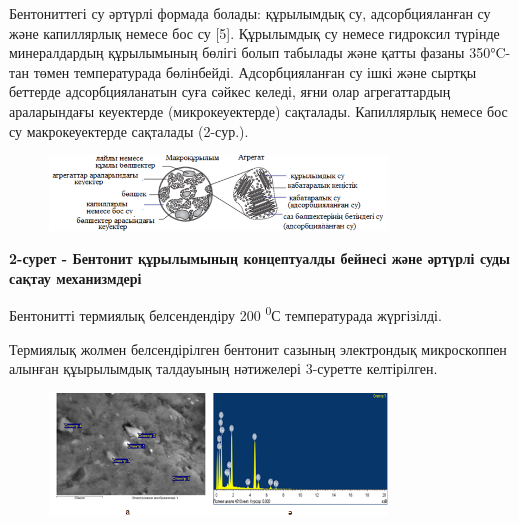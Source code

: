 Бентониттегі су әртүрлі формада болады: құрылымдық су, адсорбцияланған
су және капиллярлық немесе бос су {[}5{]}. Құрылымдық су немесе
гидроксил түрінде минералдардың құрылымының бөлігі болып табылады және
қатты фазаны 350°C-тан төмен температурада бөлінбейді. Адсорбцияланған
су ішкі және сыртқы беттерде адсорбцияланатын суға сәйкес келеді, яғни
олар агрегаттардың араларындағы кеуектерде (микрокеуектерде) сақталады.
Капиллярлық немесе бос су макрокеуектерде сақталады (2-сур.).

\begin{figure}[H]
	\centering
	\includegraphics[width=0.8\textwidth]{assets/1044}
	\caption*{}
\end{figure}

{\bfseries 2-сурет - Бентонит құрылымының концептуалды бейнесі және әртүрлі
суды} {\bfseries сақтау механизмдері}

Бентонитті термиялық белсендендіру 200 \textsuperscript{0}С
температурада жүргізілді.

Термиялық жолмен белсендірілген бентонит сазының электрондық
микроскоппен алынған құырылымдық талдауының нәтижелері 3-суретте
келтірілген.

\begin{figure}[H]
	\centering
	\includegraphics[width=0.8\textwidth]{assets/1045}
	\caption*{}
\end{figure}

